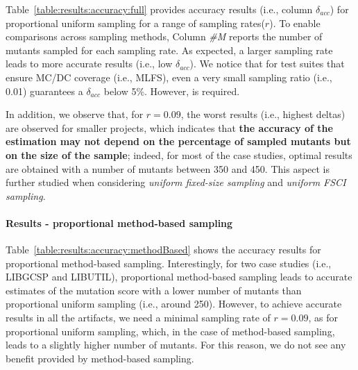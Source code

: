 Table~\ref{table:results:accuracy:full} provides accuracy results (i.e., column $\delta_{acc}$) for proportional uniform sampling for a range of sampling rates($r$). 
To enable comparisons across sampling methods, Column \emph{\#M} reports the number of mutants sampled for each sampling rate.
As expected, a larger sampling rate leads to more accurate results (i.e., low $\delta_{acc}$). 
We notice that for test suites that ensure MC/DC coverage (i.e., MLFS), even a very small sampling ratio (i.e., 0.01) guarantees a $\delta_{acc}$ below 5\%. However,  is required.



In addition, we observe that, for $r=0.09$, the worst results (i.e., highest deltas) are observed for smaller projects, which indicates that \textbf{the accuracy of the estimation may not depend on the percentage of sampled mutants but on the size of the sample}; indeed, for most of the case studies, optimal results are obtained with a number of mutants between 350 and 450. This aspect is further studied when considering  \emph{uniform fixed-size sampling} and \emph{uniform FSCI sampling}.

\paragraph{Results - proportional method-based sampling}

Table~\ref{table:results:accuracy:methodBased} shows the accuracy results for proportional method-based sampling. 
Interestingly, for two case studies (i.e., LIBGCSP and LIBUTIL), proportional method-based sampling leads to accurate estimates of the mutation score with a lower number of mutants than proportional uniform sampling (i.e., around 250).
{However, to achieve accurate results in all the artifacts, we need a minimal sampling rate of $r=0.09$, as for proportional uniform sampling, which, in the case of method-based sampling, leads to a slightly higher number of mutants. For this reason, we do not see any benefit provided by method-based sampling.}



